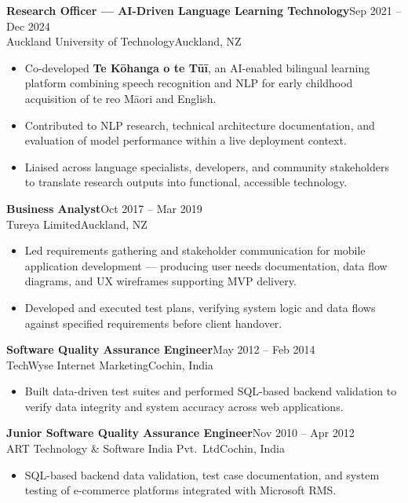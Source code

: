 \documentclass[10.5pt,a4paper]{article}
\newenvironment{expbox}{%
  \begin{tcolorbox}[
    blanker, breakable,
    left=10pt,
    borderline west={2.5pt}{0pt}{accentlt},
    before upper={\parskip=2pt},
    top=0pt, bottom=0pt
  ]
}{%
  \end{tcolorbox}\vspace{4pt}
}
\newcommand{\role}[4]{%
  {\bfseries #1}\hfill{\small\color{accent}#2}\\[-1pt]
  {\small\color{mid}#3}\hfill{\small\color{light}#4}\\[3pt]%
}
\begin{document}
\begin{expbox}
\role{Research Officer — AI-Driven Language Learning Technology}
     {Sep 2021 – Dec 2024}
     {Auckland University of Technology}
     {Auckland, NZ}
\begin{itemize}
  \item Co-developed \textbf{Te Kōhanga o te Tūī}, an AI-enabled bilingual learning platform
        combining speech recognition and NLP for early childhood acquisition of
        te reo Māori and English.
  \item Contributed to NLP research, technical architecture documentation, and evaluation
        of model performance within a live deployment context.
  \item Liaised across language specialists, developers, and community stakeholders to
        translate research outputs into functional, accessible technology.
\end{itemize}
\end{expbox}

\begin{expbox}
\role{Business Analyst}
     {Oct 2017 – Mar 2019}
     {Tureya Limited}
     {Auckland, NZ}
\begin{itemize}
  \item Led requirements gathering and stakeholder communication for mobile application
        development — producing user needs documentation, data flow diagrams, and UX
        wireframes supporting MVP delivery.
  \item Developed and executed test plans, verifying system logic and data flows against
        specified requirements before client handover.
\end{itemize}
\end{expbox}

\begin{expbox}
\role{Software Quality Assurance Engineer}
     {May 2012 – Feb 2014}
     {TechWyse Internet Marketing}
     {Cochin, India}
\begin{itemize}
  \item Built data-driven test suites and performed SQL-based backend validation to verify
        data integrity and system accuracy across web applications.
\end{itemize}
\end{expbox}

\begin{expbox}
\role{Junior Software Quality Assurance Engineer}
     {Nov 2010 – Apr 2012}
     {ART Technology \& Software India Pvt.\ Ltd}
     {Cochin, India}
\begin{itemize}
  \item SQL-based backend data validation, test case documentation, and system testing of
        e-commerce platforms integrated with Microsoft RMS.
\end{itemize}
\end{expbox}
\end{document}
